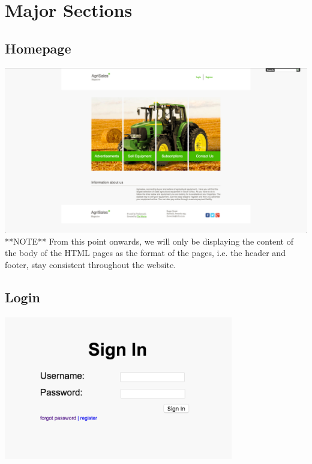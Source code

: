 \documentclass[11pt]{article}
\begin{document}


\tableofcontents

\newpage

\section{Major Sections}
	\subsection{Homepage}
		\includegraphics[width=\textwidth]{../Images/Homepage} \\
		
		**NOTE** From this point onwards, we will only be displaying the content of the body of the HTML pages as the format of the pages, i.e. the header and footer, stay consistent throughout the website.
		
	\subsection{Login}
	\includegraphics[width=0.75\textwidth]{../Images/Login}
\end{document}

